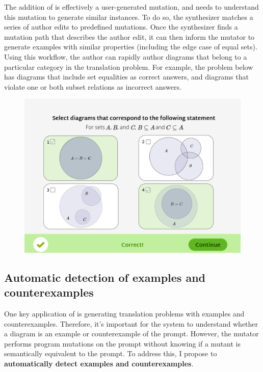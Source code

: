 The addition of  is effectively a user-generated mutation, and \Edgeworth needs to understand this mutation to generate similar instances. To do so, the \Edgeworth synthesizer matches a series of author edits to predefined mutations. Once the synthesizer finds a mutation path that describes the author edit, it can then inform the mutator to generate examples with similar properties (\ie including the edge case of equal sets). Using this workflow, the author can rapidly author diagrams that belong to a particular category in the translation problem. For example, the problem below has diagrams that include set equalities as correct answers, and diagrams that violate one or both subset relations as incorrect answers.

\vspace{10pt}
\begin{figure}[h]
    \centering
    \includegraphics[width=0.8\linewidth]{assets/appendix/translation-problem-sets.pdf}
\end{figure}
\vspace{10pt}

\subsection{Automatic detection of examples and counterexamples}
\label{sec:autodetect}

One key application of \Edgeworth is generating translation problems with examples and counterexamples. Therefore, it's important for the system to understand whether a diagram is an example or counterexample of the prompt. However, the \Edgeworth mutator performs \Substance program mutations on the prompt without knowing if a mutant is semantically equivalent to the prompt. To address this, I propose to \textbf{automatically detect examples and counterexamples}.

